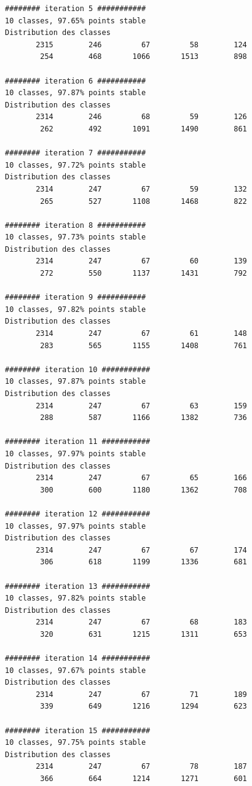 \documentclass[earth,article,submit,pdftex,moreauthors]{Definitions/mdpi}
\begin{document}
\begin{scriptsize}
\begin{verbatim}
######## iteration 5 ###########
10 classes, 97.65% points stable
Distribution des classes
       2315        246         67         58        124
        254        468       1066       1513        898

######## iteration 6 ###########
10 classes, 97.87% points stable
Distribution des classes
       2314        246         68         59        126
        262        492       1091       1490        861

######## iteration 7 ###########
10 classes, 97.72% points stable
Distribution des classes
       2314        247         67         59        132
        265        527       1108       1468        822

######## iteration 8 ###########
10 classes, 97.73% points stable
Distribution des classes
       2314        247         67         60        139
        272        550       1137       1431        792

######## iteration 9 ###########
10 classes, 97.82% points stable
Distribution des classes
       2314        247         67         61        148
        283        565       1155       1408        761

######## iteration 10 ###########
10 classes, 97.87% points stable
Distribution des classes
       2314        247         67         63        159
        288        587       1166       1382        736

######## iteration 11 ###########
10 classes, 97.97% points stable
Distribution des classes
       2314        247         67         65        166
        300        600       1180       1362        708

######## iteration 12 ###########
10 classes, 97.97% points stable
Distribution des classes
       2314        247         67         67        174
        306        618       1199       1336        681

######## iteration 13 ###########
10 classes, 97.82% points stable
Distribution des classes
       2314        247         67         68        183
        320        631       1215       1311        653

######## iteration 14 ###########
10 classes, 97.67% points stable
Distribution des classes
       2314        247         67         71        189
        339        649       1216       1294        623

######## iteration 15 ###########
10 classes, 97.75% points stable
Distribution des classes
       2314        247         67         78        187
        366        664       1214       1271        601


\end{verbatim}
\end{scriptsize}
\end{document}
